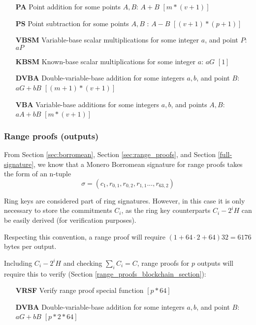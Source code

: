 \begin{itemize}
    \setlength\itemsep{\listspace}
    \item [\textbf{PA}] Point addition for some points $A, B$: $A + B$ \quad \([m*(v+1)]\)%
    \item [\textbf{PS}] Point subtraction for some points $A, B$ : $A - B$ \quad \([(v+1)*(p+1)]\)%
    \item [\textbf{VBSM}] Variable-base scalar multiplications for some integer $a$, and point $P$: $a P$ \quad [$m$]%
    \item [\textbf{KBSM}] Known-base scalar multiplications for some integer $a$: $a G$ \quad \([1]\)
    \item [\textbf{DVBA}] Double-variable-base addition for some integers $a, b$, and point $B$: $a G + b B$ \quad \([(m+1)*(v+1)]\)%
    \item [\textbf{VBA}] Variable-base additions for some integers $a, b$, and points $A, B$: $a A + b B$ \quad \([m*(v+1)]\)%
\end{itemize}


\subsubsection*{Range proofs (outputs)}

From Section \ref{sec:borromean}, Section \ref{sec:range_proofs}, and Section \ref{full-signature}, we know that a Monero Borromean signature for range proofs takes the form of an n-tuple\vspace{.2cm}%
\[\sigma = (c_1, r_{0, 1}, r_{0, 2}, r_{1, 1}..., r_{63, 2} )  \]

Ring keys are considered part of ring signatures. However, in this case it is only necessary to store the commitments $C_i$, as the ring key counterparts $C_i - 2^i H$ can be easily derived (for verification purposes). 

Respecting this convention, a range proof will require \( ( 1 + 64 \cdot 2 + 64  ) 32 = 6176\) bytes per output.

Including $C_i - 2^i H$ and checking $\sum_i C_i = C$, range proofs for $p$ outputs will require this to verify (Section \ref{range_proofs_blockchain_section}):

\begin{itemize}
    \setlength\itemsep{\listspace}
    \item [\textbf{VRSF}] Verify range proof special function \quad \([p*64]\)
    \item [\textbf{DVBA}] Double-variable-base addition for some integers $a, b$, and point $B$: $a G + b B$ \quad \([p*2*64]\)
\end{itemize}


